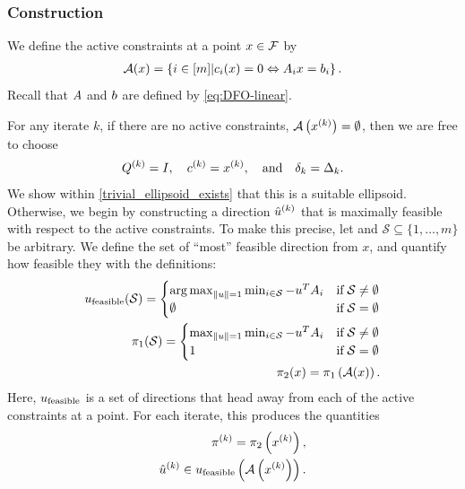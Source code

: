 \subsubsection{Construction}
\label{the_safe_ellipsoid}

We define the active constraints at a point $x \in {\mathcal F}$ by
\begin{align}
{\mathcal A}(x) = \left\{i \in [m] | c_i(x) = 0 \Leftrightarrow {{A}}_ix = {{b}}_i \right\}. \label{define_activei}
\end{align}
Recall that ${A}$ and ${b}$ are defined by \cref{eq:DFO-linear}.

For any iterate $k$, if there are no active constraints, ${\mathcal A}\left(x^{(k)}\right) = \emptyset$, then we are free to choose
\begin{align}
\label{define_linear_trivial_ellipse}
{Q^{(k)}} = I, \quad c^{(k)} = x^{(k)}, \quad \textrm{and} \quad \delta_k = \Delta_k.
\end{align}
We show within \cref{trivial_ellipsoid_exists} that this is a suitable ellipsoid.
Otherwise, we begin by constructing a direction ${{{\hat u}^{(k)}}}$ that is maximally feasible with respect to the active constraints.
To make this precise, let and $\mathcal S \subseteq \{1, \ldots, m\}$ be arbitrary.
We define the set of ``most'' feasible direction from $x$, and quantify how feasible they with the definitions:
\begin{align}
{u_{\textrm{feasible}}} (\mathcal S) = \begin{cases}
\operatorname*{arg\,max}_{\|u\| = 1} \min_{i \in \mathcal S} -u^T{{A}}_i & \text{if} \; \mathcal S \ne \emptyset \\
\emptyset & \text{if} \; \mathcal S = \emptyset
\end{cases} \label{define_alpha_one} \\
{\pi_1}(\mathcal S) = \begin{cases}
\max_{\|u\| = 1} \min_{i \in \mathcal S} -u^T{{A}}_i & \text{if} \; \mathcal S \ne \emptyset \\
1 & \text{if} \; \mathcal S = \emptyset
\end{cases} \label{define_alpha_two} \\
\pi_2(x) = {\pi_1}\left({\mathcal A}(x)\right). \label{define_alpha_three}
\end{align}
Here, ${u_{\textrm{feasible}}}$ is a set of directions that head away from each of the active constraints at a point.
For each iterate, this produces the quantities
\begin{align}
\pi^{(k)} =  \pi_2\left(x^{(k)}\right) \label{define_alpha_k}, \\
{{{\hat u}^{(k)}}} \in  {u_{\textrm{feasible}}}\left({\mathcal A}\left(x^{(k)}\right)\right). \label{define_u_k}
\end{align}
